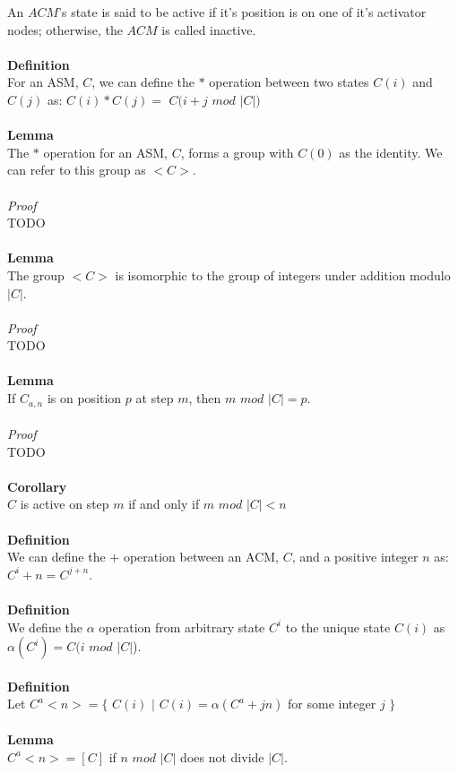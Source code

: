 \documentclass[a4paper,12pt]{article}
\begin{document}
An $ACM$'s state is said to be active if it's position is on one of it's activator nodes; otherwise, the $ACM$ is called inactive.\\
\\
\textbf{Definition} \\
For an ASM, $C$, we can define the $*$ operation between two states $C(i)$ and $C(j)$ as:
$C(i) * C(j) =$ $C(i + j$ $mod$ $|C|)$\\
\\
\textbf{Lemma}\\
The $*$ operation for an ASM, $C$, forms a group with $C(0)$ as the identity. We can refer to this group as $<C>$.\\ 
\\
\textit{Proof}\\  
TODO\\
\\
\textbf{Lemma}\\
The group $<C>$ is isomorphic to the group of integers under addition modulo $|C|$.\\
\\
\textit{Proof}\\  
TODO\\
\\
\textbf{Lemma}\\
If $C_{a,n}$ is on position $p$ at step $m$, then $m$ $mod$ $|C| = p$.\\
\\
\textit{Proof}\\  
TODO\\
\\
\textbf{Corollary}\\
$C$ is active on step $m$ if and only if $m$ $mod$ $|C| < n$\\
\\
\textbf{Definition} \\
We can define the $+$ operation between an ACM, $C$, and a positive integer $n$ as: $C^i + n = C^{j+n}$.\\
\\
\textbf{Definition} \\
We define the $\alpha$ operation from arbitrary state $C^i$ to the unique state $C(i)$ as $\alpha(C^i) = C(i$ $mod$ $|C|$).\\  
\\
\textbf{Definition}\\
Let $C^a<n> = \{$ $C(i)$ $|$  $C(i) = \alpha(C^a + jn)$ for some integer $j$ $\}$\\
\\
\textbf{Lemma}\\
$C^a<n> = [C]$ if $n$ $mod$ $|C|$ does not divide $|C|$. 
\end{document}
